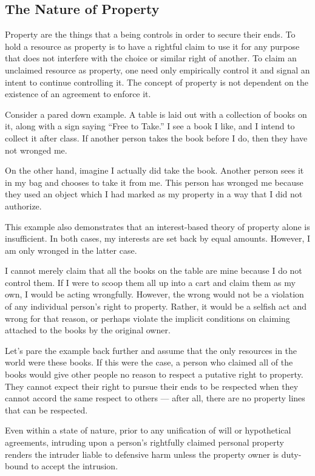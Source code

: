 \documentclass[12pt]{article}
\begin{document}
	\subsection{The Nature of Property}

	Property are the things that a being controls in order to secure their
	ends.  To hold a resource as property is to have a rightful claim to use it
	for any purpose that does not interfere with the choice or similar right of
	another.  To claim an unclaimed resource as property, one need only
	empirically control it and signal an intent to continue controlling it.
	The concept of property is not dependent on the existence of an agreement to
	enforce it.

	Consider a pared down example. A table is laid out with a collection of
	books on it, along with a sign saying “Free to Take.” I see a book I like,
	and I intend to collect it after class. If another person takes the book
	before I do, then they have not wronged me.

	On the other hand, imagine I actually did take the book. Another person
	sees it in my bag and chooses to take it from me. This person has wronged
	me because they used an object which I had marked as my property in a way
	that I did not authorize.

	This example also demonstrates that an interest-based theory of property
	alone is insufficient. In both cases, my interests are set back by equal
	amounts. However, I am only wronged in the latter case.

	I cannot merely claim that all the books on the table are mine because I do
	not control them. If I were to scoop them all up into a cart and claim them
	as my own, I would be acting wrongfully. However, the wrong would not be
	a violation of any individual person’s right to property. Rather, it would
	be a selfish act and wrong for that reason, or perhaps violate the implicit
	conditions on claiming attached to the books by the original owner.

	Let’s pare the example back further and assume that the only resources in
	the world were these books. If this were the case, a person who claimed all
	of the books would give other people no reason to respect a putative right
	to property. They cannot expect their right to pursue their ends to be
	respected when they cannot accord the same respect to others --- after all,
	there are no property lines that can be respected.

	Even within a state of nature, prior to any unification of will or
	hypothetical agreements, intruding upon a person’s rightfully claimed
	personal property renders the intruder liable to defensive harm unless the
	property owner is duty-bound to accept the intrusion.
\end{document}
